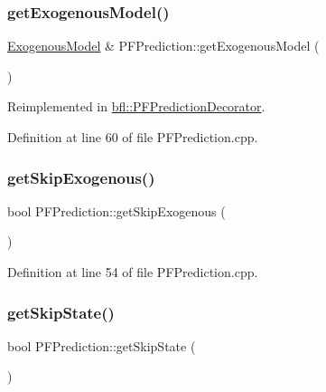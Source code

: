 \subsubsection{\texorpdfstring{get\+Exogenous\+Model()}{getExogenousModel()}}
{\footnotesize\ttfamily \mbox{\hyperlink{classbfl_1_1ExogenousModel}{Exogenous\+Model}} \& P\+F\+Prediction\+::get\+Exogenous\+Model (\begin{DoxyParamCaption}{ }\end{DoxyParamCaption})\hspace{0.3cm}{\ttfamily [virtual]}}



Reimplemented in \mbox{\hyperlink{classbfl_1_1PFPredictionDecorator_a8d25d3765f642f7de1af897d088d8da9}{bfl\+::\+P\+F\+Prediction\+Decorator}}.



Definition at line 60 of file P\+F\+Prediction.\+cpp.

\mbox{\label{classbfl_1_1PFPrediction_a432b8e84dbf00432158aa82312386d63}} 
\subsubsection{\texorpdfstring{get\+Skip\+Exogenous()}{getSkipExogenous()}}
{\footnotesize\ttfamily bool P\+F\+Prediction\+::get\+Skip\+Exogenous (\begin{DoxyParamCaption}{ }\end{DoxyParamCaption})}



Definition at line 54 of file P\+F\+Prediction.\+cpp.

\mbox{\label{classbfl_1_1PFPrediction_a323ca5612dd7ad924fd448a629359ad2}} 
\subsubsection{\texorpdfstring{get\+Skip\+State()}{getSkipState()}}
{\footnotesize\ttfamily bool P\+F\+Prediction\+::get\+Skip\+State (\begin{DoxyParamCaption}{ }\end{DoxyParamCaption})}



